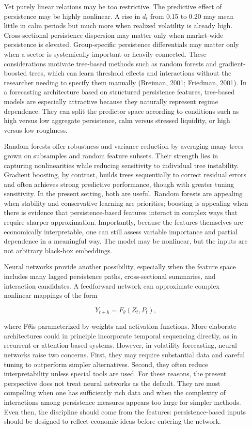 \documentclass[12pt]{article}
\begin{document}
Yet purely linear relations may be too restrictive. The predictive effect of persistence may be highly nonlinear. A rise in $d_t$ from 0.15 to 0.20 may mean little in calm periods but much more when realized volatility is already high. Cross-sectional persistence dispersion may matter only when market-wide persistence is elevated. Group-specific persistence differentials may matter only when a sector is systemically important or heavily connected. These considerations motivate tree-based methods such as random forests and gradient-boosted trees, which can learn threshold effects and interactions without the researcher needing to specify them manually (Breiman, 2001; Friedman, 2001). In a forecasting architecture based on structured persistence features, tree-based models are especially attractive because they naturally represent regime dependence. They can split the predictor space according to conditions such as high versus low aggregate persistence, calm versus stressed liquidity, or high versus low roughness.

Random forests offer robustness and variance reduction by averaging many trees grown on subsamples and random feature subsets. Their strength lies in capturing nonlinearities while reducing sensitivity to individual tree instability. Gradient boosting, by contrast, builds trees sequentially to correct residual errors and often achieves strong predictive performance, though with greater tuning sensitivity. In the present setting, both are useful. Random forests are appealing when stability and conservative learning are priorities; boosting is appealing when there is evidence that persistence-based features interact in complex ways that require sharper approximation. Importantly, because the features themselves are economically interpretable, one can still assess variable importance and partial dependence in a meaningful way. The model may be nonlinear, but the inputs are not arbitrary black-box embeddings.

Neural networks provide another possibility, especially when the feature space includes many lagged persistence paths, cross-sectional summaries, and interaction candidates. A feedforward network can approximate complex nonlinear mappings of the form

\[Y_{t+h} = F_\theta(Z_t, P_t),\]

where F$\theta$is parameterized by weights and activation functions. More elaborate architectures could in principle incorporate temporal sequencing directly, as in recurrent or attention-based systems. However, in volatility forecasting, neural networks raise two concerns. First, they may require substantial data and careful tuning to outperform simpler alternatives. Second, they often reduce interpretability unless special tools are used. For these reasons, the present perspective does not treat neural networks as the default. They are most compelling when one has sufficiently rich data and when the complexity of interactions among persistence measures appears too large for simpler methods. Even then, the discipline should come from the features: persistence-based inputs should be designed to reflect economic ideas before entering the network.
\end{document}

